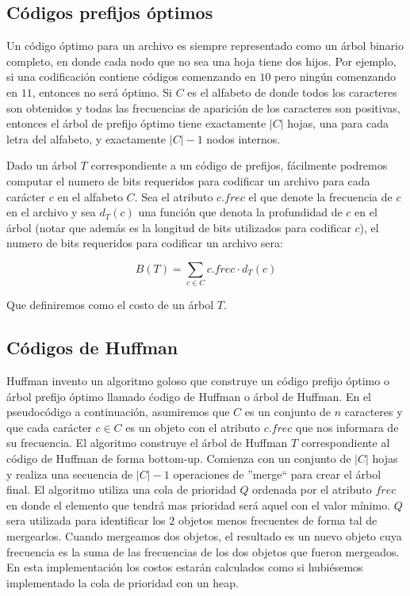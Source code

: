 \documentclass[10pt, a4paper]{report}
\begin{document}
\subsection{C\'odigos prefijos \'optimos}

Un c\'odigo \'optimo para un archivo es siempre representado como un \'arbol binario completo, en donde cada nodo que no sea una hoja tiene dos hijos. Por ejemplo, si una codificaci\'on contiene c\'odigos comenzando en $10$ pero ning\'un comenzando en $11$, entonces no ser\'a \'optimo. Si $C$ es el alfabeto de donde todos los caracteres son obtenidos y todas las frecuencias de aparici\'on de los caracteres son positivas, entonces el \'arbol de prefijo \'optimo tiene exactamente $|C|$ hojas, una para cada letra del alfabeto, y exactamente $|C|-1$ nodos internos.

Dado un \'arbol $T$ correspondiente a un c\'odigo de prefijos, f\'acilmente podremos computar el numero de bits requeridos para codificar un archivo para cada car\'acter $c$ en el alfabeto $C$. Sea el atributo $c.frec$ el que denote la frecuencia de $c$ en el archivo y sea $d_T(c)$ una funci\'on que denota la profundidad de $c$ en el \'arbol (notar que adem\'as es la longitud de bits utilizados para codificar $c$), el numero de bits requeridos para codificar un archivo sera:

\begin{equation*}
 B(T) = \sum_{c \in C} c.frec \cdot d_T(c)
\end{equation*}

Que definiremos como el costo de un \'arbol $T$.

\subsection{C\'odigos de Huffman}

Huffman invento un algoritmo goloso que construye un c\'odigo prefijo \'optimo o \'arbol prefijo \'optimo llamado \'codigo de Huffman o \'arbol de Huffman. En el pseudoc\'odigo a continuaci\'on, asumiremos que $C$ es un conjunto de $n$ caracteres y que cada car\'acter $c \in C$ es un objeto con el atributo $c.frec$ que nos informara de su frecuencia. El algoritmo construye el \'arbol de Huffman $T$ correspondiente al c\'odigo de Huffman de forma bottom-up. Comienza con un conjunto de $|C|$ hojas y realiza una secuencia de $|C|-1$ operaciones de ''merge`` para crear el \'arbol final. El algoritmo utiliza una cola de prioridad $Q$ ordenada por el atributo $frec$ en donde el elemento que tendr\'a mas prioridad ser\'a aquel con el valor m\'inimo. $Q$ sera utilizada para identificar los $2$ objetos menos frecuentes de forma tal de mergearlos. Cuando mergeamos dos objetos, el resultado es un nuevo objeto cuya frecuencia es la suma de las frecuencias de los dos objetos que fueron mergeados. En esta implementaci\'on 
los costos estar\'an calculados como si hubi\'esemos implementado la cola de prioridad con un heap.
\end{document}
